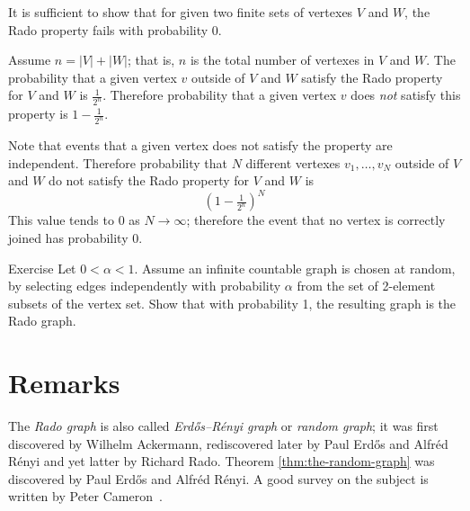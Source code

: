 It is sufficient to show that for given two finite sets of vertexes $V$ and $W$, the Rado property fails with probability 0.

Assume $n=|V|+|W|$; that is, $n$ is the total number of vertexes in $V$ and $W$.
The probability that a given vertex $v$ outside of $V$ and $W$ satisfy the Rado property for $V$ and $W$
is $\tfrac1{2^n}$.
Therefore probability that a given vertex $v$ does {}\emph{not} satisfy this property
is $1-\tfrac1{2^n}$.

Note that events that a given vertex does not satisfy the property are independent.
Therefore probability that $N$ different vertexes $v_1,\dots,v_N$ outside of $V$ and $W$ do not satisfy the Rado property for $V$ and $W$ is 
\[(1-\tfrac1{2^n})^N\]
This value tends to 0 as $N \to \infty$; 
therefore the event that no vertex is correctly joined has probability 0.
\qeds

\begin{thm}{Exercise}
Let $0<\alpha<1$.
Assume an infinite countable graph is chosen at random, by selecting edges independently with probability $\alpha$ from the set of 2-element subsets of the vertex set.
Show that with probability 1, the resulting graph is the Rado graph.
\end{thm}

\section*{Remarks}

The {}\emph{Rado graph} is also called \emph{Erd\H{o}s–R\'enyi graph} or \emph{random graph};
it was first discovered by Wilhelm Ackermann, rediscovered later by
Paul Erd\H{o}s and Alfr\'ed R\'enyi and yet latter by Richard Rado. 
Theorem \ref{thm:the-random-graph} was discovered by Paul Erd\H{o}s and Alfr\'ed R\'enyi.
A good survey on the subject is written by Peter Cameron~\cite{cameron}.


